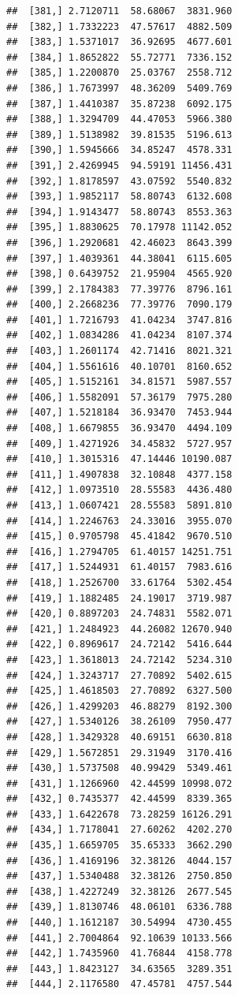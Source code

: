 \documentclass[article]{jss}\usepackage[]{graphicx}\usepackage[]{xcolor}
\makeatletter
\newenvironment{kframe}{%
 \def\at@end@of@kframe{}%
 \ifinner\ifhmode%
  \def\at@end@of@kframe{\end{minipage}}%
  \begin{minipage}{\columnwidth}%
 \fi\fi%
 \def\FrameCommand##1{\hskip\@totalleftmargin \hskip-\fboxsep
 \colorbox{shadecolor}{##1}\hskip-\fboxsep
     \hskip-\linewidth \hskip-\@totalleftmargin \hskip\columnwidth}%
 \MakeFramed {\advance\hsize-\width
   \@totalleftmargin\z@ \linewidth\hsize
   \@setminipage}}%
 {\par\unskip\endMakeFramed%
 \at@end@of@kframe}
\newenvironment{knitrout}{}{} %
\makeatother
\begin{document}
\begin{knitrout}
\begin{kframe}
\begin{verbatim}
##  [381,] 2.7120711  58.68067  3831.960
##  [382,] 1.7332223  47.57617  4882.509
##  [383,] 1.5371017  36.92695  4677.601
##  [384,] 1.8652822  55.72771  7336.152
##  [385,] 1.2200870  25.03767  2558.712
##  [386,] 1.7673997  48.36209  5409.769
##  [387,] 1.4410387  35.87238  6092.175
##  [388,] 1.3294709  44.47053  5966.380
##  [389,] 1.5138982  39.81535  5196.613
##  [390,] 1.5945666  34.85247  4578.331
##  [391,] 2.4269945  94.59191 11456.431
##  [392,] 1.8178597  43.07592  5540.832
##  [393,] 1.9852117  58.80743  6132.608
##  [394,] 1.9143477  58.80743  8553.363
##  [395,] 1.8830625  70.17978 11142.052
##  [396,] 1.2920681  42.46023  8643.399
##  [397,] 1.4039361  44.38041  6115.605
##  [398,] 0.6439752  21.95904  4565.920
##  [399,] 2.1784383  77.39776  8796.161
##  [400,] 2.2668236  77.39776  7090.179
##  [401,] 1.7216793  41.04234  3747.816
##  [402,] 1.0834286  41.04234  8107.374
##  [403,] 1.2601174  42.71416  8021.321
##  [404,] 1.5561616  40.10701  8160.652
##  [405,] 1.5152161  34.81571  5987.557
##  [406,] 1.5582091  57.36179  7975.280
##  [407,] 1.5218184  36.93470  7453.944
##  [408,] 1.6679855  36.93470  4494.109
##  [409,] 1.4271926  34.45832  5727.957
##  [410,] 1.3015316  47.14446 10190.087
##  [411,] 1.4907838  32.10848  4377.158
##  [412,] 1.0973510  28.55583  4436.480
##  [413,] 1.0607421  28.55583  5891.810
##  [414,] 1.2246763  24.33016  3955.070
##  [415,] 0.9705798  45.41842  9670.510
##  [416,] 1.2794705  61.40157 14251.751
##  [417,] 1.5244931  61.40157  7983.616
##  [418,] 1.2526700  33.61764  5302.454
##  [419,] 1.1882485  24.19017  3719.987
##  [420,] 0.8897203  24.74831  5582.071
##  [421,] 1.2484923  44.26082 12670.940
##  [422,] 0.8969617  24.72142  5416.644
##  [423,] 1.3618013  24.72142  5234.310
##  [424,] 1.3243717  27.70892  5402.615
##  [425,] 1.4618503  27.70892  6327.500
##  [426,] 1.4299203  46.88279  8192.300
##  [427,] 1.5340126  38.26109  7950.477
##  [428,] 1.3429328  40.69151  6630.818
##  [429,] 1.5672851  29.31949  3170.416
##  [430,] 1.5737508  40.99429  5349.461
##  [431,] 1.1266960  42.44599 10998.072
##  [432,] 0.7435377  42.44599  8339.365
##  [433,] 1.6422678  73.28259 16126.291
##  [434,] 1.7178041  27.60262  4202.270
##  [435,] 1.6659705  35.65333  3662.290
##  [436,] 1.4169196  32.38126  4044.157
##  [437,] 1.5340488  32.38126  2750.850
##  [438,] 1.4227249  32.38126  2677.545
##  [439,] 1.8130746  48.06101  6336.788
##  [440,] 1.1612187  30.54994  4730.455
##  [441,] 2.7004864  92.10639 10133.566
##  [442,] 1.7435960  41.76844  4158.778
##  [443,] 1.8423127  34.63565  3289.351
##  [444,] 2.1176580  47.45781  4757.544

\end{verbatim}
\end{kframe}
\end{knitrout}
\end{document}
